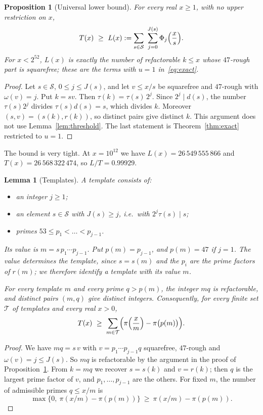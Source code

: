 \documentclass[11pt,a4paper]{article}
\newtheorem{proposition}[theorem]{Proposition}
\newtheorem{lemma}[theorem]{Lemma}
\theoremstyle{definition}
\newcommand{\cS}{\mathcal S}
\newcommand{\cT}{\mathcal T}
\begin{document}
\begin{proposition}[Universal lower bound]\label{prop:L}
For every real $x\ge1$, with no upper restriction on $x$,
\[
T(x)\ \ge\ L(x):=\sum_{s\in\cS}\ \sum_{j=0}^{J(s)}\Phi_j\Bigl(\frac{x}{s}\Bigr).
\]
For $x<2^{52}$, $L(x)$ is exactly the number of refactorable $k\le x$ whose $47$-rough part is squarefree; these are the terms with $u=1$ in~\eqref{eq:exact}.
\end{proposition}

\begin{proof}
Let $s\in\cS$, $0\le j\le J(s)$, and let $v\le x/s$ be squarefree and $47$-rough with $\omega(v)=j$. Put $k=sv$. Then $\tau(k)=\tau(s)\,2^{j}$. Since $2^j\mid d(s)$, the number $\tau(s)2^j$ divides $\tau(s)d(s)=s$, which divides $k$. Moreover $(s,v)=(s(k),r(k))$, so distinct pairs give distinct $k$. This argument does not use Lemma~\ref{lem:threshold}. The last statement is Theorem~\ref{thm:exact} restricted to $u=1$.
\end{proof}

The bound is very tight. At $x=10^{12}$ we have $L(x)=26\,549\,555\,866$ and $T(x)=26\,568\,322\,474$, so $L/T=0.99929$.

\begin{lemma}[Templates]\label{lem:template}
A \emph{template} consists of:
\begin{itemize}
\item an integer $j\ge1$;
\item an element $s\in\cS$ with $J(s)\ge j$, i.e.\ with $2^j\tau(s)\mid s$;
\item primes $53\le p_1<\dots<p_{j-1}$.
\end{itemize}
Its \emph{value} is $m=s\,p_1\cdots p_{j-1}$. Put $p(m)=p_{j-1}$, and $p(m)=47$ if $j=1$. The value determines the template, since $s=s(m)$ and the $p_i$ are the prime factors of $r(m)$; we therefore identify a template with its value $m$.

For every template $m$ and every prime $q>p(m)$, the integer $mq$ is refactorable, and distinct pairs $(m,q)$ give distinct integers. Consequently, for every finite set $\cT$ of templates and every real $x>0$,
\begin{equation}\label{eq:template}
T(x)\ \ge\ \sum_{m\in\cT}\Bigl(\pi\Bigl(\frac{x}{m}\Bigr)-\pi\bigl(p(m)\bigr)\Bigr).
\end{equation}
\end{lemma}

\begin{proof}
We have $mq=s\,v$ with $v=p_1\cdots p_{j-1}q$ squarefree, $47$-rough and $\omega(v)=j\le J(s)$. So $mq$ is refactorable by the argument in the proof of Proposition~\ref{prop:L}. From $k=mq$ we recover $s=s(k)$ and $v=r(k)$; then $q$ is the largest prime factor of $v$, and $p_1,\dots,p_{j-1}$ are the others. For fixed $m$, the number of admissible primes $q\le x/m$ is
\[
\max\{0,\ \pi(x/m)-\pi(p(m))\}\ \ge\ \pi(x/m)-\pi(p(m)).
\]
\end{proof}
\end{document}
